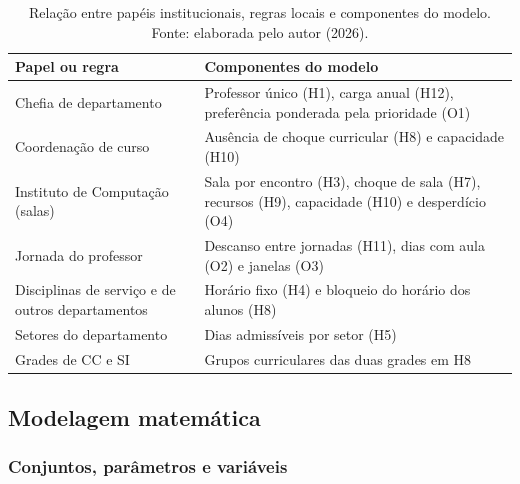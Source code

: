 \begin{table}[htbp]
  \centering
  \caption{Relação entre papéis institucionais, regras locais e componentes do modelo. Fonte: elaborada pelo autor (2026).}
  \label{tab:papeis}
  \small
  \begin{tabular}{p{6.2cm}p{8.2cm}}
    \toprule
    \textbf{Papel ou regra} & \textbf{Componentes do modelo} \\
    \midrule
    Chefia de departamento & Professor único (H1), carga anual (H12), preferência ponderada pela prioridade (O1) \\
    Coordenação de curso & Ausência de choque curricular (H8) e capacidade (H10) \\
    Instituto de Computação (salas) & Sala por encontro (H3), choque de sala (H7), recursos (H9), capacidade (H10) e desperdício (O4) \\
    Jornada do professor & Descanso entre jornadas (H11), dias com aula (O2) e janelas (O3) \\
    Disciplinas de serviço e de outros departamentos & Horário fixo (H4) e bloqueio do horário dos alunos (H8) \\
    Setores do departamento & Dias admissíveis por setor (H5) \\
    Grades de CC e SI & Grupos curriculares das duas grades em H8 \\
    \bottomrule
  \end{tabular}
\end{table}

\subsection{Modelagem matemática}
\label{subsec:modelagem}

\subsubsection{Conjuntos, parâmetros e variáveis}

